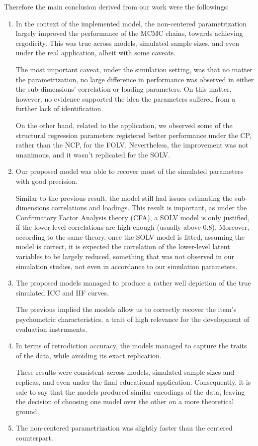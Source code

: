 \noindent Therefore the main conclusion derived from our work were the followings:
%
\begin{enumerate}
	\item In the context of the implemented model, the non-centered parametrization largely improved the performance of the MCMC chains, towards achieving ergodicity. This was true across models, simulated sample sizes, and even under the real application, albeit with some caveats. 

	The most important caveat, under the simulation setting, was that no matter the parametrization, no large difference in performance was observed in either the sub-dimensions' correlation or loading parameters. On this matter, however, no evidence supported the idea the parameters suffered from a further lack of identification.
	
	On the other hand, related to the application, we observed some of the structural regression parameters registered better performance under the CP, rather than the NCP, for the FOLV. Nevertheless, the improvement was not unanimous, and it wasn't replicated for the SOLV. 
	\item Our proposed model was able to recover most of the simulated parameters with good precision.
	
	Similar to the previous result, the model still had issues estimating the sub-dimensions correlations and loadings. This result is important, as under the Confirmatory Factor Analysis theory (CFA), a SOLV model is only justified, if the lower-level correlations are high enough (usually above $0.8$). Moreover, according to the same theory, once the SOLV model is fitted, assuming the model is correct, it is expected the correlation of the lower-level latent variables to be largely reduced, something that was not observed in our simulation studies, not even in accordance to our simulation parameters.
	\item The proposed models managed to produce a rather well depiction of the true simulated ICC and IIF curves. 
	
	The previous implied the models allow us to correctly recover the item's psychometric characteristics, a trait of high relevance for the development of evaluation instruments.
	\item In terms of retrodiction accuracy, the models managed to capture the traits of the data, while avoiding its exact replication. 
	
	These results were consistent across models, simulated sample sizes and replicas, and even under the final educational application. Consequently, it is safe to say that the models produced similar encodings of the data, leaving the decision of choosing one model over the other on a more theoretical ground.
	\item The non-centered parametrization was slightly faster than the centered counterpart.
	

\end{enumerate}
